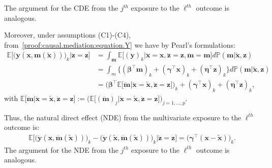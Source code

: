\documentclass[
  12pt]{article}
\def\E{\mathbb{E}}
\def\M{\mathbf{m}}
\begin{document}
The argument for the CDE from the $j^{th}$ exposure to the $\ell^{th}$ outcome is analogous.

Moreover, under assumptions (C1)-(C4), from~\eqref{proof:causal.mediation:equation.Y} we have by Pearl's formulations:  
\begin{align*}
\E \big[ \big( \ddot{\mathbf{y}}(\mathbf{x},\M(\widetilde{\mathbf{x}})) \big)_{k} \big| \ddot{\mathbf{z}} = \mathbf{z} \big]  &=  \int_{\mathbf{m}}  \E \big[ (\ddot{\mathbf{y}})_{k} \big| \ddot{\mathbf{x}} = \mathbf{x} , \ddot{\mathbf{z}} = \mathbf{z} , \ddot{\mathbf{m}} = \mathbf{m} \big] d \mathbb{P} (\mathbf{m} | \widetilde{\mathbf{x}}, \mathbf{z})  
\\
&=   \int_{m} \big\{  ( \bm{\beta}^{\top} \mathbf{m} )_{k}  + ( \bm{\gamma}^{\top} \mathbf{x} )_{k}  +  ( \bm{\eta}^{\top} \mathbf{z} )_{k}  \big\}  d \mathbb{P} (\mathbf{m} | \widetilde{\mathbf{x}}, \mathbf{z})   
\\
&= \big( \bm{\beta}^{\top} \E \big[  \ddot{\mathbf{m}}  \big| \ddot{\mathbf{x}} = \widetilde{\mathbf{x}}, \ddot{\mathbf{z}} = \mathbf{z} \big] \big)_{k} + ( \bm{\gamma}^{\top} \mathbf{x} )_{k}  +  ( \bm{\eta}^{\top} \mathbf{z} )_{k}  ,  
\end{align*} 
with $\E \big[  \ddot{\mathbf{m}}  \big| \ddot{\mathbf{x}} = \widetilde{\mathbf{x}}, \ddot{\mathbf{z}} = \mathbf{z} \big] := \big( \E \big[ (\ddot{\mathbf{m}})_{j}  \big| \ddot{\mathbf{x}} = \widetilde{\mathbf{x}}, \ddot{\mathbf{z}} = \mathbf{z} \big] \big)_{j = 1, ..., p}$.  

Thus, the natural direct effect (NDE) from the multivariate exposure to the $\ell^{th}$ outcome is: 
\begin{align*}
\E \big[ \big( \ddot{\mathbf{y}}(\mathbf{x},\ddot{\mathbf{m}}(\widetilde{\mathbf{x}})) \big)_{k} - \big( \ddot{\mathbf{y}}(\widetilde{\mathbf{x}},\ddot{\mathbf{m}}(\widetilde{\mathbf{x}})) \big)_{k} \big| \ddot{\mathbf{z}} = \mathbf{z} \big]   =  \big( \bm{\gamma}^{\top} (\mathbf{x} - \widetilde{\mathbf{x}} ) \big)_{k}  . 
\end{align*}
The argument for the NDE from the $j^{th}$ exposure to the $\ell^{th}$ outcome is analogous.
\end{document}
